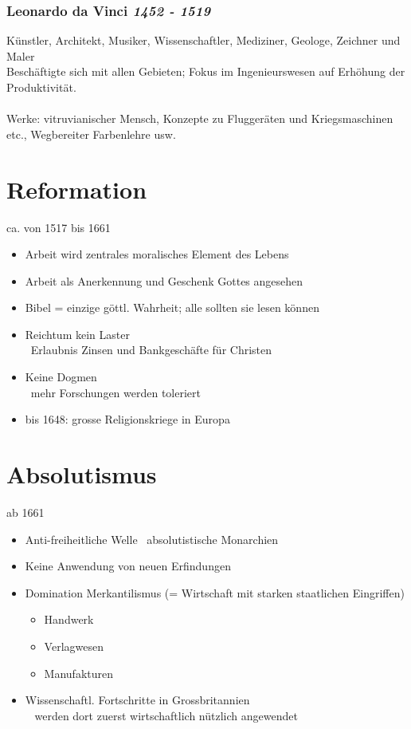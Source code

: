 \documentclass{report}
\begin{document}
\subsubsection{Leonardo da Vinci \rm{\textit{1452 - 1519}}}
Künstler, Architekt, Musiker, Wissenschaftler, Mediziner, Geologe, Zeichner und Maler\\
Beschäftigte sich mit allen Gebieten; Fokus im Ingenieurswesen auf Erhöhung der Produktivität.\\\\
Werke: vitruvianischer Mensch, Konzepte zu Fluggeräten und Kriegsmaschinen etc., Wegbereiter Farbenlehre usw.

\newpage

\section{Reformation}
ca. von 1517 bis 1661\\
\begin{itemize}
	\item Arbeit wird zentrales moralisches Element des Lebens
	\item Arbeit als Anerkennung und Geschenk Gottes angesehen
	\item Bibel = einzige göttl. Wahrheit; alle sollten sie lesen können
	\item Reichtum kein Laster\\
	\arrow~Erlaubnis Zinsen und Bankgeschäfte für Christen
	\item Keine Dogmen\\
	\arrow~mehr Forschungen werden toleriert
	\item bis 1648: grosse Religionskriege in Europa
\end{itemize}

\section{Absolutismus}
ab 1661
\begin{itemize}
	\item Anti-freiheitliche Welle \arrow~absolutistische Monarchien
	\item Keine Anwendung von neuen Erfindungen
	\item Domination Merkantilismus (= Wirtschaft mit starken staatlichen Eingriffen)
		\begin{itemize}
			\item Handwerk
			\item Verlagwesen
			\item Manufakturen
		\end{itemize}
	\item Wissenschaftl. Fortschritte in Grossbritannien\\
	\arrow~ werden dort zuerst wirtschaftlich nützlich angewendet
\end{itemize}
\end{document}

